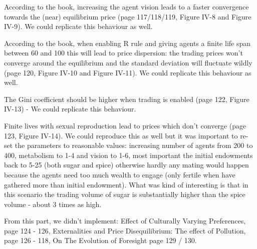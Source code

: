 According to the book, increasing the agent vision leads to a faster convergence towards the (near) equilibrium price (page 117/118/119, Figure IV-8 and Figure IV-9). We could replicate this behaviour as well.

According to the book, when enabling R rule and giving agents a finite life span between 60 and 100 this will lead to price dispersion: the trading prices won't converge around the equilibrium and the standard deviation will fluctuate wildly (page 120, Figure IV-10 and Figure IV-11). We could replicate this behaviour as well.

The Gini coefficient should be higher when trading is enabled (page 122, Figure IV-13) - We could replicate this behaviour.

Finite lives with sexual reproduction lead to prices which don't converge (page 123, Figure IV-14). We could reproduce this as well but it was important to re-set the parameters to reasonable values: increasing number of agents from 200 to 400, metabolism to 1-4 and vision to 1-6, most important the initial endowments back to 5-25 (both sugar and spice) otherwise hardly any mating would happen because the agents need too much wealth to engage (only fertile when have gathered more than initial endowment). What was kind of interesting is that in this scenario the trading volume of sugar is substantially higher than the spice volume - about 3 times as high. 

From this part, we didn't implement: Effect of Culturally Varying Preferences, page 124 - 126, Externalities and Price Disequilibrium: The effect of Pollution, page 126 - 118, On The Evolution of Foresight page 129 / 130. 


